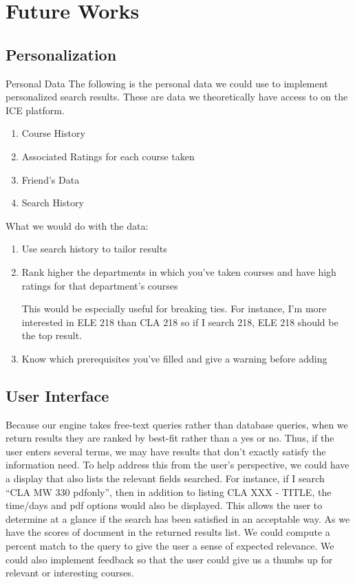 \documentclass[12pt,letterpaper]{article}
\begin{document}
\section{Future Works}

\subsection{Personalization}

Personal Data
The following is the personal data we could use to implement personalized search results. These are data we theoretically have access to on the ICE platform.
\begin{enumerate}
\item Course History
\item Associated Ratings for each course taken
\item Friend's Data
\item Search History
\end{enumerate}
What we would do with the data:
\begin{enumerate}
\item Use search history to tailor results

\item Rank higher the departments in which you've taken courses and have high ratings for that department's courses

This would be especially useful for breaking ties. For instance, I'm more interested in ELE 218 than CLA 218 so if I search 218, ELE 218 should be the top result. 

\item Know which prerequisites you've filled and give a warning before adding

\end{enumerate}

	
\subsection{User Interface}
Because our engine takes free-text queries rather than database queries, when we return results they are ranked by best-fit rather than a yes or no. Thus, if the user enters several terms, we may have results that don't exactly satisfy the information need. To help address this from the user's perspective, we could have a display that also lists the relevant fields searched. For instance, if I search ``CLA MW 330 pdfonly'', then in addition to listing CLA XXX - TITLE, the time/days and pdf options would also be displayed. This allows the user to determine at a glance if the search has been satisfied in an acceptable way. 
As we have the scores of document in the returned results list. We could compute a percent match to the query to give the user a sense of expected relevance. We could also implement feedback so that the user could give us a thumbs up for relevant or interesting courses. 
\end{document}
